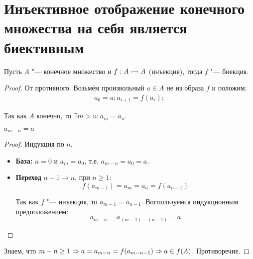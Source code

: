 ﻿\section{Инъективное отображение конечного множества на себя является биективным}

\begin{theorem}{}
Пусть $A$ "--- конечное множество и $f: A \rightarrowtail A$ (инъекция), тогда $f$ "--- биекция.
\end{theorem}

\begin{proof}
От противного. Возьмём произвольный $a \in A$ не из образа $f$ и положим:
\begin{gather*}
a_0 = a;
a_{i + 1} = f(a_i);
\end{gather*}

Так как $A$ конечно, то $\exists m > n \colon a_m = a_n$.

\begin{lemma}{}
    $a_{m - n} = a$    
\end{lemma}
    \begin{proof}
        Индукция по $n$.
        \begin{itemize}
        \item {\bf База:} $n = 0$ и $a_m = a_0$, т.е. $a_{m-n} = a_0 = a$.
        \item {\bf Переход} $n - 1 \to n$, при $n \ge 1$:
        \[f(a_{m - 1}) = a_m = a_n = f(a_{n - 1})\]

        Так как $f$ "--- инъекция, то $a_{m - 1} = a_{n - 1}$. Воспользуемся
        индукционным предположением: \[a_{m - n} = a_{(m - 1) - (n - 1)} = a\]
        \end{itemize}
    \end{proof}

Знаем, что $m-n\ge 1 \Rightarrow a=a_{m-n}=f(a_{m-n-1}) \Rightarrow a \in f(A)$. Противоречие.
\end{proof}
